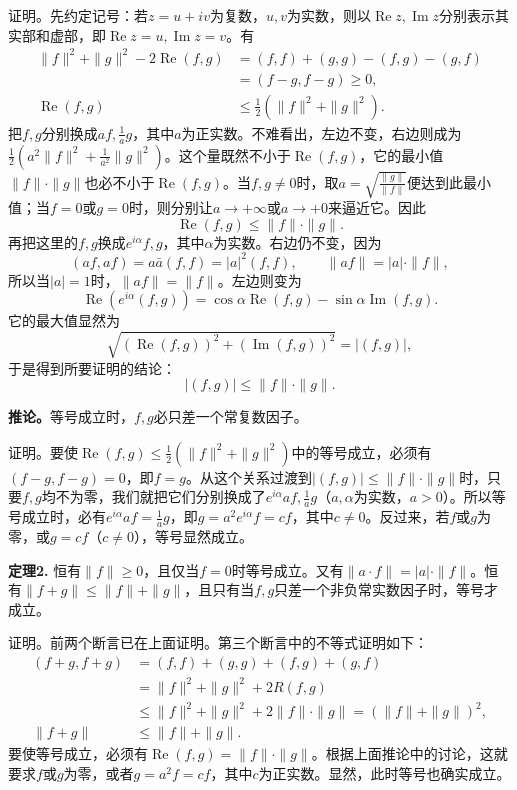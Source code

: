 \documentclass[fontsize=13pt,twoside,openany,headings=normal,parskip=false,bookmarkpackage=false,DIV=calc]{scrbook}
\newcommand{\textkaishu}[1]{{\zhkaishu #1}}
\begin{document}
\textkaishu{证明。}先约定记号：若$z=u+iv$为复数，$u,\allowbreak v$为实数，则以$\operatorname{Re}z,\allowbreak \operatorname{Im}z$分别表示其实部和虚部，即$\operatorname{Re}z=u,\allowbreak \operatorname{Im}z=v$。有
\begin{align*}
\|f\|^2+\|g\|^2-2\operatorname{Re}(f,g)
&=(f,f)+(g,g)-(f,g)-(g,f)\\
&=(f-g,f-g)\geq0,\\
\operatorname{Re}(f,g)&\leq\tfrac12(\|f\|^2+\|g\|^2).
\end{align*}
把$f,\allowbreak g$分别换成$af,\allowbreak \frac1a g$，其中$a$为正实数。不难看出，左边不变，右边则成为$\frac12(a^2\|f\|^2+\frac1{a^2}\|g\|^2)$。这个量既然不小于$\operatorname{Re}(f,\allowbreak g)$，它的最小值$\|f\|\cdot\|g\|$也必不小于$\operatorname{Re}(f,\allowbreak g)$。当$f,\allowbreak g\ne0$时，取$a=\sqrt{\frac{\|g\|}{\|f\|}}$便达到此最小值；当$f=0$或$g=0$时，则分别让$a\to+\infty$或$a\to+0$来逼近它。\hypertarget{origpage-22}{}\label{origpage-22}因此
\[
\operatorname{Re}(f,g)\leq\|f\|\cdot\|g\|.
\]
再把这里的$f,\allowbreak g$换成$e^{i\alpha}f,\allowbreak g$，其中$\alpha$为实数。右边仍不变，因为
\[
(af,af)=a\bar a(f,f)=|a|^2(f,f),\qquad
\|af\|=|a|\cdot\|f\|,
\]
所以当$|a|=1$时，$\|af\|=\|f\|$。左边则变为
\[
\operatorname{Re}(e^{i\alpha}(f,g))
=\cos\alpha\operatorname{Re}(f,g)-\sin\alpha\operatorname{Im}(f,g).
\]
它的最大值显然为
\[
\sqrt{(\operatorname{Re}(f,g))^2+(\operatorname{Im}(f,g))^2}=|(f,g)|,
\]
于是得到所要证明的结论：
\[
|(f,g)|\leq\|f\|\cdot\|g\|.
\]

\textbf{推论。}等号成立时，$f,\allowbreak g$必只差一个常复数因子。

\textkaishu{证明。}要使$\operatorname{Re}(f,\allowbreak g)\leq\frac12(\|f\|^2+\|g\|^2)$中的等号成立，必须有$(f-g,\allowbreak f-g)=0$，即$f=g$。从这个关系过渡到$|(f,\allowbreak g)|\leq\|f\|\cdot\|g\|$时，只要$f,\allowbreak g$均不为零，我们就把它们分别换成了$e^{i\alpha}af,\allowbreak \frac1a g$（$a,\allowbreak \alpha$为实数，$a>0$）。所以等号成立时，必有$e^{i\alpha}af=\frac1a g$，即$g=a^2e^{i\alpha}f=cf$，其中$c\ne0$。反过来，若$f$或$g$为零，或$g=cf$（$c\ne0$），等号显然成立。

\leavevmode{}\textbf{定理2.}\label{thm:II.2} 恒有$\|f\|\geq0$，且仅当$f=0$时等号成立。又有$\|a\cdot f\|=|a|\cdot\|f\|$。恒有$\|f+g\|\leq\|f\|+\|g\|$，且只有当$f,\allowbreak g$只差一个非负常实数因子时，等号才成立。

\textkaishu{证明。}前两个断言已在上面证明。第三个断言中的不等式证明如下：
\begin{align*}
(f+g,f+g)&=(f,f)+(g,g)+(f,g)+(g,f)\\
&=\|f\|^2+\|g\|^2+2R(f,g)\\
&\leq\|f\|^2+\|g\|^2+2\|f\|\cdot\|g\|
=(\|f\|+\|g\|)^2,\\
\|f+g\|&\leq\|f\|+\|g\|.
\end{align*}
要使等号成立，必须有$\operatorname{Re}(f,\allowbreak g)=\|f\|\cdot\|g\|$。根据上面推论中的讨论，这就要求$f$或$g$为零，或者$g=a^2f=cf$，其中$c$为正实数。显然，此时等号也确实成立。
\end{document}

